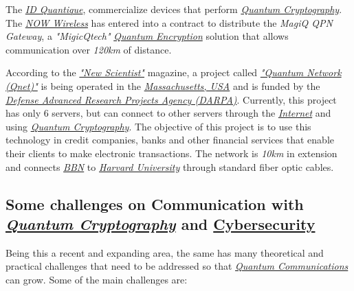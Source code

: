 \documentclass[conference]{IEEEtran}
\begin{document}
\vspace{4pt}

The \href{https://en.wikipedia.org/wiki/ID_Quantique}{\textit{ID Quantique}}, commercialize devices that perform \href{https://en.wikipedia.org/wiki/Quantum_cryptography}{\textit{Quantum Cryptography}}. The \href{https://nowwireless.com/}{\textit{NOW Wireless}} has entered into a contract to distribute the \textit{MagiQ QPN Gateway}, a \textit{"MigicQtech"} \href{https://en.wikipedia.org/wiki/Quantum_cryptography}{\textit{Quantum Encryption}} solution that allows communication over \textit{120km} of distance.

\vspace{4pt}

According to the \href{https://en.wikipedia.org/wiki/New_Scientist}{\textit{"New Scientist"}} magazine, a project called \href{http://www.e-quantum.com/qnet.php}{\textit{"Quantum Network (Qnet)"}} is being operated in the \href{https://en.wikipedia.org/wiki/Massachusetts}{\textit{Massachusetts, USA}} and is funded by the \href{https://en.wikipedia.org/wiki/DARPA}{\textit{Defense Advanced Research Projects Agency (DARPA)}}. Currently, this project has only 6 servers, but can connect to other servers through the \href{https://en.wikipedia.org/wiki/Internet}{\textit{Internet}} and using \href{https://en.wikipedia.org/wiki/Quantum_cryptography}{\textit{Quantum Cryptography}}. The objective of this project is to use this technology in credit companies, banks and other financial services that enable their clients to make electronic transactions. The network is \textit{10km} in extension and connects \href{https://en.wikipedia.org/wiki/BBN_Technologies}{\textit{BBN}} to \href{https://en.wikipedia.org/wiki/Harvard_University}{\textit{Harvard University}} through standard fiber optic cables.

\vspace{6pt}

\subsection{Some challenges on Communication with \\\href{https://en.wikipedia.org/wiki/Quantum_cryptography}{\textit{Quantum Cryptography}} and \href{https://en.wikipedia.org/wiki/Computer_security}{Cybersecurity}}

Being this a recent and expanding area, the same has many theoretical and practical challenges that need to be addressed so that \href{https://en.wikipedia.org/wiki/Quantum_information_science}{\textit{Quantum Communications}} can grow. Some of the main challenges are:
\end{document}
